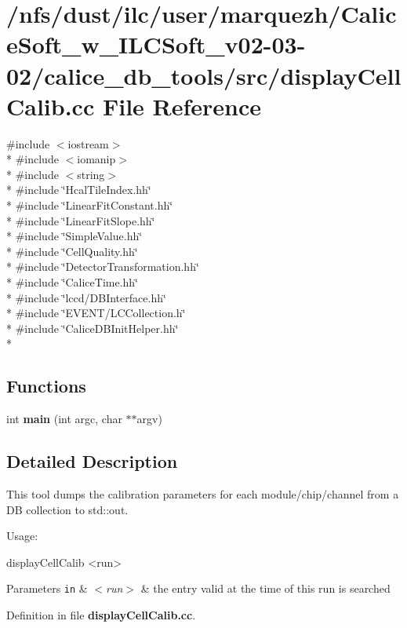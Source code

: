 \section{/nfs/dust/ilc/user/marquezh/\-Calice\-Soft\-\_\-w\-\_\-\-I\-L\-C\-Soft\-\_\-v02-\/03-\/02/calice\-\_\-db\-\_\-tools/src/display\-Cell\-Calib.cc File Reference}
\label{displayCellCalib_8cc}
{\ttfamily \#include $<$iostream$>$}\\*
{\ttfamily \#include $<$iomanip$>$}\\*
{\ttfamily \#include $<$string$>$}\\*
{\ttfamily \#include \char`\"{}Hcal\-Tile\-Index.\-hh\char`\"{}}\\*
{\ttfamily \#include \char`\"{}Linear\-Fit\-Constant.\-hh\char`\"{}}\\*
{\ttfamily \#include \char`\"{}Linear\-Fit\-Slope.\-hh\char`\"{}}\\*
{\ttfamily \#include \char`\"{}Simple\-Value.\-hh\char`\"{}}\\*
{\ttfamily \#include \char`\"{}Cell\-Quality.\-hh\char`\"{}}\\*
{\ttfamily \#include \char`\"{}Detector\-Transformation.\-hh\char`\"{}}\\*
{\ttfamily \#include \char`\"{}Calice\-Time.\-hh\char`\"{}}\\*
{\ttfamily \#include \char`\"{}lccd/\-D\-B\-Interface.\-hh\char`\"{}}\\*
{\ttfamily \#include \char`\"{}E\-V\-E\-N\-T/\-L\-C\-Collection.\-h\char`\"{}}\\*
{\ttfamily \#include \char`\"{}Calice\-D\-B\-Init\-Helper.\-hh\char`\"{}}\\*
\subsection*{Functions}
\begin{DoxyCompactItemize}
\item 
int {\bfseries main} (int argc, char $\ast$$\ast$argv)\label{displayCellCalib_8cc_a3c04138a5bfe5d72780bb7e82a18e627}

\end{DoxyCompactItemize}


\subsection{Detailed Description}
This tool dumps the calibration parameters for each module/chip/channel from a D\-B collection to std\-::out.

Usage\-:


\begin{DoxyCode}
displayCellCalib <run>
\end{DoxyCode}



\begin{DoxyParams}[1]{Parameters}
\mbox{\tt in}  & {\em $<$run$>$} & the entry valid at the time of this run is searched \\
\hline
\end{DoxyParams}


Definition in file {\bf display\-Cell\-Calib.\-cc}.

